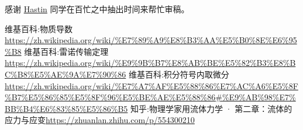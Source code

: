 \documentclass[fontset=windows]{article}
\begin{document}
感谢 \href{https://hastin-blog.cn/}{Hastin} 同学在百忙之中抽出时间来帮忙审稿。

\begin{thebibliography}{30}

     维基百科:物质导数\url{https://zh.wikipedia.org/wiki/%E7%89%A9%E8%B3%AA%E5%B0%8E%E6%95%B8} 
     维基百科:雷诺传输定理\url{https://zh.wikipedia.org/wiki/%E9%9B%B7%E8%AB%BE%E5%82%B3%E8%BC%B8%E5%AE%9A%E7%90%86} 
     维基百科:积分符号内取微分\url{https://zh.wikipedia.org/wiki/%E7%A7%AF%E5%88%86%E7%AC%A6%E5%8F%B7%E5%86%85%E5%8F%96%E5%BE%AE%E5%88%86#%E9%AB%98%E7%BB%B4%E6%83%85%E5%86%B5}
     知乎:物理学家用流体力学 · 第二章：流体的应力与应变\url{https://zhuanlan.zhihu.com/p/554300210}


\end{thebibliography}
\end{document}
